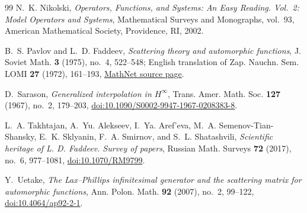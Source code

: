\documentclass[11pt]{amsart}
\theoremstyle{definition}
\theoremstyle{remark}
\begin{document}
\begin{thebibliography}{99}
N.~K. Nikolski,
\emph{Operators, Functions, and Systems: An Easy Reading. Vol.~2:
Model Operators and Systems},
Mathematical Surveys and Monographs, vol.~93,
American Mathematical Society, Providence, RI, 2002.

B.~S. Pavlov and L.~D. Faddeev,
\emph{Scattering theory and automorphic functions},
J. Soviet Math. \textbf{3} (1975), no.~4, 522--548;
English translation of Zap. Nauchn. Sem. LOMI \textbf{27} (1972), 161--193,
\href{https://www.mathnet.ru/eng/znsl2505}{MathNet source page}.

D.~Sarason,
\emph{Generalized interpolation in $H^\infty$},
Trans. Amer. Math. Soc. \textbf{127} (1967), no.~2, 179--203,
\href{https://doi.org/10.1090/S0002-9947-1967-0208383-8}
{doi:10.1090/S0002-9947-1967-0208383-8}.

L.~A. Takhtajan, A.~Yu. Alekseev, I.~Ya. Aref'eva,
M.~A. Semenov-Tian-Shansky, E.~K. Sklyanin, F.~A. Smirnov,
and S.~L. Shatashvili,
\emph{Scientific heritage of L. D. Faddeev. Survey of papers},
Russian Math. Surveys \textbf{72} (2017), no.~6, 977--1081,
\href{https://doi.org/10.1070/RM9799}{doi:10.1070/RM9799}.

Y.~Uetake,
\emph{The Lax--Phillips infinitesimal generator and the scattering matrix for
automorphic functions},
Ann. Polon. Math. \textbf{92} (2007), no.~2, 99--122,
\href{https://doi.org/10.4064/ap92-2-1}{doi:10.4064/ap92-2-1}.

\end{thebibliography}
\end{document}
